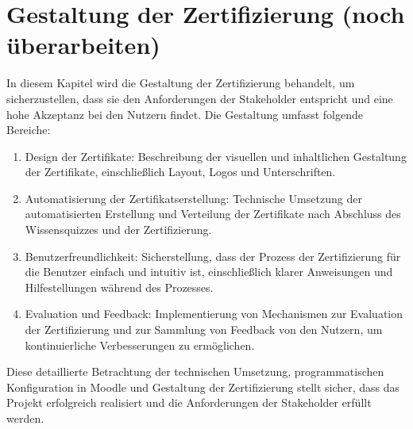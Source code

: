 \section{Gestaltung der Zertifizierung \color{red} (noch überarbeiten)}
In diesem Kapitel wird die Gestaltung der Zertifizierung behandelt, um sicherzustellen, dass sie den Anforderungen der Stakeholder entspricht und eine hohe Akzeptanz bei den Nutzern findet. Die Gestaltung umfasst folgende Bereiche:
\begin{enumerate}
    \item Design der Zertifikate: Beschreibung der visuellen und inhaltlichen Gestaltung der Zertifikate, einschließlich Layout, Logos und Unterschriften.
    \item Automatisierung der Zertifikatserstellung: Technische Umsetzung der automatisierten Erstellung und Verteilung der Zertifikate nach Abschluss des Wissensquizzes und der Zertifizierung.
    \item Benutzerfreundlichkeit: Sicherstellung, dass der Prozess der Zertifizierung für die Benutzer einfach und intuitiv ist, einschließlich klarer Anweisungen und Hilfestellungen während des Prozesses.
    \item Evaluation und Feedback: Implementierung von Mechanismen zur Evaluation der Zertifizierung und zur Sammlung von Feedback von den Nutzern, um kontinuierliche Verbesserungen zu ermöglichen.
\end{enumerate}
Diese detaillierte Betrachtung der technischen Umsetzung, programmatischen Konfiguration in Moodle und Gestaltung der Zertifizierung stellt sicher, dass das Projekt erfolgreich realisiert und die Anforderungen der Stakeholder erfüllt werden.


